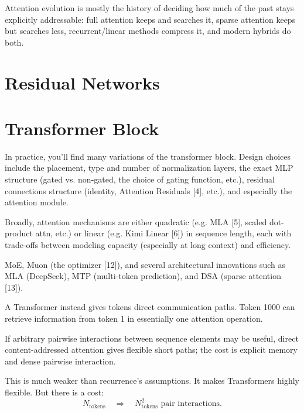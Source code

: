 \begin{calloutmemoryhook}
Attention evolution is mostly the history of deciding how much of the past stays explicitly addressable: full attention keeps and searches it, sparse attention keeps but searches less, recurrent/linear methods compress it, and modern hybrids do both.
\end{calloutmemoryhook}






\section{Residual Networks}



\section{Transformer Block}
\label{sec:modern-transformer}
In practice, you'll find many variations of the transformer block. Design choices include the placement, type and number of normalization layers, the exact MLP structure (gated vs. non-gated, the choice of gating function, etc.), residual connections structure (identity, Attention Residuals [4], etc.), and especially the attention module.

Broadly, attention mechanisms are either quadratic (e.g. MLA [5], scaled dot-product attn, etc.) or linear (e.g. Kimi Linear [6]) in sequence length, each with trade-offs between modeling capacity (especially at long context) and efficiency.

MoE, Muon (the optimizer [12]), and several architectural innovations such as MLA (DeepSeek), MTP (multi-token prediction), and DSA (sparse attention [13]).

A Transformer instead gives tokens direct communication paths.
Token 1000 can retrieve information from token 1 in essentially one attention operation.

\begin{calloutbias}
If arbitrary pairwise interactions between sequence elements may be useful, direct content-addressed attention gives flexible short paths; the cost is explicit memory and dense pairwise interaction.
\end{calloutbias}

This is much weaker than recurrence's assumptions.
It makes Transformers highly flexible.
But there is a cost:
\[
N_{\text{tokens}}
\quad\Rightarrow\quad
N_{\text{tokens}}^2\text{ pair interactions}.
\]

